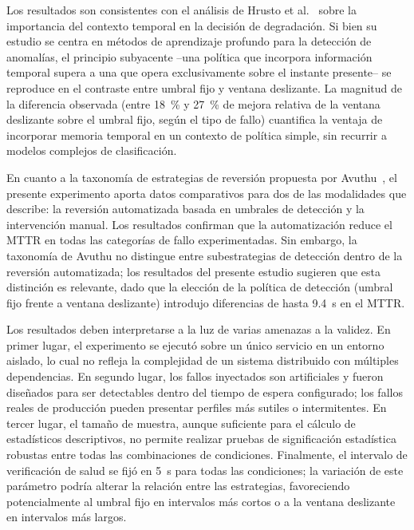 \documentclass[conference]{IEEEtran}
\begin{document}
Los resultados son consistentes con el an\'alisis de Hrusto et al.~\cite{hrusto2022optimization} sobre la importancia del contexto temporal en la decisi\'on de degradaci\'on. Si bien su estudio se centra en m\'etodos de aprendizaje profundo para la detecci\'on de anomal\'ias, el principio subyacente --una pol\'itica que incorpora informaci\'on temporal supera a una que opera exclusivamente sobre el instante presente-- se reproduce en el contraste entre umbral fijo y ventana deslizante. La magnitud de la diferencia observada (entre 18~\% y 27~\% de mejora relativa de la ventana deslizante sobre el umbral fijo, seg\'un el tipo de fallo) cuantifica la ventaja de incorporar memoria temporal en un contexto de pol\'itica simple, sin recurrir a modelos complejos de clasificaci\'on.

En cuanto a la taxonom\'ia de estrategias de reversi\'on propuesta por Avuthu~\cite{avuthu2021change}, el presente experimento aporta datos comparativos para dos de las modalidades que describe: la reversi\'on automatizada basada en umbrales de detecci\'on y la intervenci\'on manual. Los resultados confirman que la automatizaci\'on reduce el MTTR en todas las categor\'ias de fallo experimentadas. Sin embargo, la taxonom\'ia de Avuthu no distingue entre subestrategias de detecci\'on dentro de la reversi\'on automatizada; los resultados del presente estudio sugieren que esta distinci\'on es relevante, dado que la elecci\'on de la pol\'itica de detecci\'on (umbral fijo frente a ventana deslizante) introdujo diferencias de hasta 9.4~s en el MTTR.

Los resultados deben interpretarse a la luz de varias amenazas a la validez. En primer lugar, el experimento se ejecut\'o sobre un \'unico servicio en un entorno aislado, lo cual no refleja la complejidad de un sistema distribuido con m\'ultiples dependencias. En segundo lugar, los fallos inyectados son artificiales y fueron dise\~nados para ser detectables dentro del tiempo de espera configurado; los fallos reales de producci\'on pueden presentar perfiles m\'as sutiles o intermitentes. En tercer lugar, el tama\~no de muestra, aunque suficiente para el c\'alculo de estad\'isticos descriptivos, no permite realizar pruebas de significaci\'on estad\'istica robustas entre todas las combinaciones de condiciones. Finalmente, el intervalo de verificaci\'on de salud se fij\'o en 5~s para todas las condiciones; la variaci\'on de este par\'ametro podr\'ia alterar la relaci\'on entre las estrategias, favoreciendo potencialmente al umbral fijo en intervalos m\'as cortos o a la ventana deslizante en intervalos m\'as largos.
\end{document}
